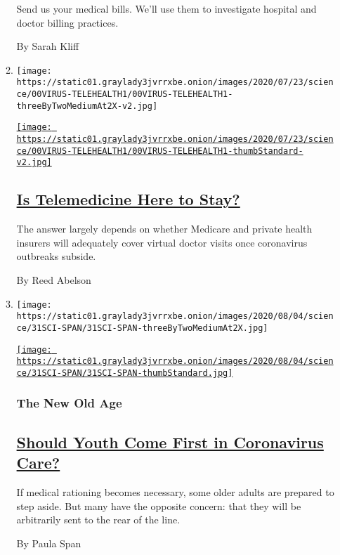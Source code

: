 \begin{enumerate}
\begin{enumerate}
    Send us your medical bills. We'll use them to investigate hospital
    and doctor billing practices.

    By Sarah Kliff
  \item
    \texttt{[image: https://static01.graylady3jvrrxbe.onion/images/2020/07/23/science/00VIRUS-TELEHEALTH1/00VIRUS-TELEHEALTH1-threeByTwoMediumAt2X-v2.jpg]}

    \href{/2020/08/03/health/covid-telemedicine-congress.html}{\texttt{[image: https://static01.graylady3jvrrxbe.onion/images/2020/07/23/science/00VIRUS-TELEHEALTH1/00VIRUS-TELEHEALTH1-thumbStandard-v2.jpg]}}

    \hypertarget{is-telemedicine-here-to-stay}{%
    \subsection{\texorpdfstring{\href{/2020/08/03/health/covid-telemedicine-congress.html}{Is
    Telemedicine Here to
    Stay?}}{Is Telemedicine Here to Stay?}}\label{is-telemedicine-here-to-stay}}

    The answer largely depends on whether Medicare and private health
    insurers will adequately cover virtual doctor visits once
    coronavirus outbreaks subside.

    By Reed Abelson
  \item
    \texttt{[image: https://static01.graylady3jvrrxbe.onion/images/2020/08/04/science/31SCI-SPAN/31SCI-SPAN-threeByTwoMediumAt2X.jpg]}

    \href{/2020/07/31/health/coronavirus-ethics-rationing-elderly.html}{\texttt{[image: https://static01.graylady3jvrrxbe.onion/images/2020/08/04/science/31SCI-SPAN/31SCI-SPAN-thumbStandard.jpg]}}

    \hypertarget{the-new-old-age}{%
    \subsubsection{The New Old Age}\label{the-new-old-age}}

    \hypertarget{should-youth-come-first-in-coronavirus-care}{%
    \subsection{\texorpdfstring{\href{/2020/07/31/health/coronavirus-ethics-rationing-elderly.html}{Should
    Youth Come First in Coronavirus
    Care?}}{Should Youth Come First in Coronavirus Care?}}\label{should-youth-come-first-in-coronavirus-care}}

    If medical rationing becomes necessary, some older adults are
    prepared to step aside. But many have the opposite concern: that
    they will be arbitrarily sent to the rear of the line.

    By Paula Span
  \end{enumerate}
\end{enumerate}

